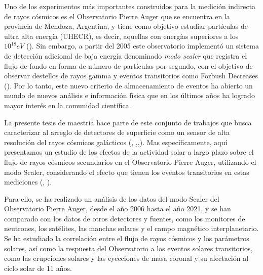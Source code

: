Uno de los experimentos más importantes construidos para la medición indirecta de rayos cósmicos es el Observatorio Pierre Auger que se encuentra en la provincia de Mendoza, Argentina, y tiene como objetivo estudiar partículas de ultra alta energía (UHECR), es decir, aquellas con energías superiores a los $10^{18}eV$ (\cite{AugerGENERAL_2015}). Sin embargo, a partir del 2005 este observatorio implementó un sistema de detección adicional de baja energía denominado \textit{modo scaler} que registra el flujo de fondo en forma de número de partículas por segundo, con el objetivo de observar destellos de rayos gamma y eventos transitorios como Forbush Decreases (\cite{DASSO20121563}). Por lo tanto, este nuevo criterio de almacenamiento de eventos ha abierto un mundo de nuevos análisis e información física que en los últimos años ha logrado mayor interés en la comunidad científica.

La presente tesis de maestría hace parte de este conjunto de trabajos que busca caracterizar al arreglo de detectores de superficie como un sensor de alta resolución del rayos cósmicos galácticos (\cite{DASSO20121563}, \cite{asorey},\cite{masias_2017},\cite{Martin_Schimassek2022}). Mas específicamente, aquí presentamos un estudio de los efectos de la actividad solar a largo plazo sobre el flujo de rayos cósmicos secundarios en el Observatorio Pierre Auger, utilizando el modo Scaler, considerando el efecto que tienen los eventos transitorios en estas mediciones (\cite{roberta_2018}, \cite{Martin_Schimassek2022}). 

Para ello, se ha realizado un análisis de los datos del modo Scaler del Observatorio Pierre Auger, desde el año 2006 hasta el año 2021, y se han comparado con los datos de otros detectores y fuentes, como los monitores de neutrones, los satélites, las manchas solares y el campo magnético interplanetario. Se ha estudiado la correlación entre el flujo de rayos cósmicos y los parámetros solares, así como la respuesta del Observatorio a los eventos solares transitorios, como las erupciones solares y las eyecciones de masa coronal y su afectación al ciclo solar de 11 años.

